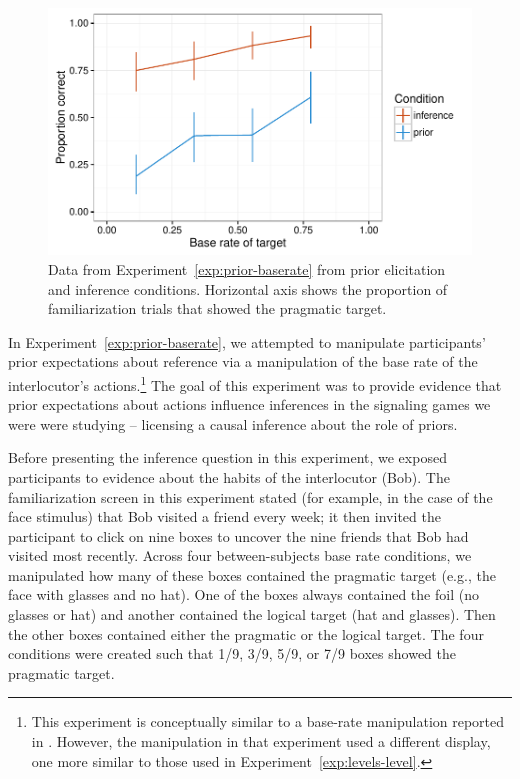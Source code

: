\documentclass[man]{apa6}
\newcounter{Experiment}
\newcommand{\exptref}[1]{Experiment~\ref{#1}}
\begin{document}
\begin{figure}[t]
  \centering
  \includegraphics[width=5in]{../plots/2-prior-baserates.pdf}
  \caption{\label{fig:prior-baserate} Data from \exptref{exp:prior-baserate} from prior elicitation and inference conditions. Horizontal axis shows the proportion of familiarization trials that showed the pragmatic target.}
\end{figure}

In \exptref{exp:prior-baserate}, we attempted to manipulate participants' prior expectations about reference via a manipulation of the base rate of the interlocutor's actions.\footnote{This experiment is conceptually similar to a base-rate manipulation reported in . However, the manipulation in that experiment used a different display, one more similar to those used in \exptref{exp:levels-level}.} The goal of this experiment was to provide evidence that prior expectations about actions influence inferences in the signaling games we were were studying -- licensing a causal inference about the role of priors.

Before presenting the inference question in this experiment, we exposed participants to evidence about the habits of the interlocutor (Bob). The familiarization screen in this experiment stated (for example, in the case of the face stimulus) that Bob visited a friend every week; it then invited the participant to click on nine boxes to uncover the nine friends that Bob had visited most recently. Across four between-subjects base rate conditions, we manipulated how many of these boxes contained the pragmatic target (e.g., the face with glasses and no hat). One of the boxes always contained the foil (no glasses or hat) and another contained the logical target (hat and glasses). Then the other boxes contained either the pragmatic or the logical target. The four conditions were created such that 1/9, 3/9, 5/9, or 7/9 boxes showed the pragmatic target.
\end{document}
